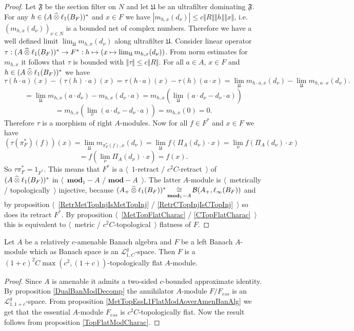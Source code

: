 \begin{proof}
Let $\mathfrak{F}$ be the section filter on $N$ and let $\mathfrak{U}$ be an ultrafilter dominating $\mathfrak{F}$. For any $h\in (A\mathbin{\widehat{\otimes}}\ell_1(B_F))^*$ and $x\in F$ we have $|m_{h,x}(d_\nu)|\leq c\Vert R\Vert\Vert h\Vert\Vert x\Vert$, i.e. $(m_{h,x}(d_\nu))_{\nu\in N}$ is a bounded net of complex numbers. Therefore we have a well defined limit $\lim_{\mathfrak{U}}m_{h,x}(d_\nu)$ along ultrafilter $\mathfrak{U}$. Consider linear operator $\tau:(A\mathbin{\widehat{\otimes}}\ell_1(B_F))^*\to F^*:h\mapsto(x\mapsto\lim_{\mathfrak{U}}m_{h,x}(d_\nu))$. From norm estimates for $m_{h,x}$ it follows that $\tau$ is bounded with $\Vert\tau\Vert\leq c\Vert R\Vert$. For all $a\in A$, $x\in F$ and $h\in (A\mathbin{\widehat{\otimes}}\ell_1(B_F))^*$ we have
$$
\tau(h\cdot a)(x)-(\tau(h)\cdot a)(x)
=\tau(h\cdot a)(x)-\tau(h)(a\cdot x)
=\lim_{\mathfrak{U}}m_{h\cdot a,x}(d_\nu)-\lim_{\mathfrak{U}}m_{h,a\cdot x}(d_\nu).
$$
$$
=\lim_{\mathfrak{U}}m_{h,x}(a\cdot d_\nu)-m_{h,x}(d_\nu\cdot a)
=m_{h,x}\left(\lim_{\mathfrak{U}}(a\cdot d_\nu-d_\nu\cdot a)\right)
$$
$$
=m_{h,x}\left(\lim_{\nu}(a\cdot d_\nu-d_\nu\cdot a)\right)
=m_{h,x}(0)
=0.
$$
Therefore $\tau$ is a morphism of right $A$-modules. Now for all $f\in F^*$ and $x\in F$ we have
$$
(\tau(\pi_F^*)(f))(x)
=\lim_{\mathfrak{U}}m_{\pi_F^*(f),x}(d_\nu)
=\lim_{\mathfrak{U}}f(\Pi_A(d_\nu)\cdot x)
=\lim_{\nu}f(\Pi_A(d_\nu)\cdot x)
$$
$$
=f\left(\lim_{\nu}\Pi_A(d_\nu)\cdot x\right)
=f(x).
$$
So $\tau\pi_F^*=1_{F^*}$. This means that $F^*$ is a $\langle$~$1$-retract / $c^2 C$-retract~$\rangle$ of $(A\mathbin{\widehat{\otimes}}\ell_1(B_F))^*$
 in $\langle$~$\mathbf{mod}_1-A$ / $\mathbf{mod}-A$~$\rangle$. The latter $A$-module is $\langle$~metrically / topologically~$\rangle$ injective, because $(A_+\mathbin{\widehat{\otimes}}\ell_1(B_F))^*\mathop{\mathbin{\cong}}\limits_{\mathbf{mod}_1-A}\mathcal{B}(A_+,\ell_\infty(B_F))$ and by proposition $\langle$~\ref{RetrMetTopInjIsMetTopInj} / \ref{RetrCTopInjIsCTopInj}~$\rangle$ so does its retract $F^*$. By proposition $\langle$~\ref{MetTopFlatCharac} / \ref{CTopFlatCharac}~$\rangle$ this is equivalent to $\langle$~metric / $c^2 C$-topological~$\rangle$ flatness of $F$.
\end{proof}

\begin{theorem}\label{TopL1FlatModAoverAmenBanAlg} Let $A$ be a relatively $c$-amenable Banach algebra and $F$ be a left Banach $A$-module which as Banach space is an $\mathscr{L}_{1, C}^g$-space. Then $F$ is a $(1+c)^2C\max(c^2,(1+c))$-topologically flat $A$-module.
\end{theorem}
\begin{proof} Since $A$ is amenable it admits a two-sided $c$-bounded approximate identity. By proposition \ref{DualBanModDecomp} the annihilator $A$-module $F/F_{ess}$ is an $\mathscr{L}_{1,1+c}^g$-space. From proposition \ref{MetTopEssL1FlatModAoverAmenBanAlg} we get that the essential $A$-module $F_{ess}$ is $c^2 C$-topologically flat. Now the result follows from proposition \ref{TopFlatModCharac}.
\end{proof}

